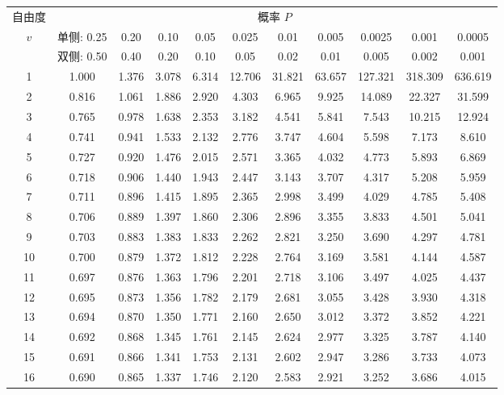 \documentclass[lang=cn,10pt]{elegantbook}
\begin{document}
\begin{longtable}{c|cccccccccc}
    \hline
    自由度 & \multicolumn{10}{c}{概率 $P$} \\
    $v$ & 单侧: 0.25 & 0.20 & 0.10 & 0.05 & 0.025 & 0.01 & 0.005 & 0.0025 & 0.001 & 0.0005 \\
    & 双侧: 0.50 & 0.40 & 0.20 & 0.10 & 0.05 & 0.02 & 0.01 & 0.005 & 0.002 & 0.001 \\
    \hline
    \endhead
    1  & 1.000 & 1.376 & 3.078 & 6.314 & 12.706 & 31.821 & 63.657 & 127.321 & 318.309 & 636.619 \\
    2  & 0.816 & 1.061 & 1.886 & 2.920 & 4.303  & 6.965  & 9.925  & 14.089  & 22.327  & 31.599 \\
    3  & 0.765 & 0.978 & 1.638 & 2.353 & 3.182  & 4.541  & 5.841  & 7.543   & 10.215  & 12.924 \\
    4  & 0.741 & 0.941 & 1.533 & 2.132 & 2.776  & 3.747  & 4.604  & 5.598   & 7.173   & 8.610 \\
    5  & 0.727 & 0.920 & 1.476 & 2.015 & 2.571  & 3.365  & 4.032  & 4.773   & 5.893   & 6.869 \\
    6  & 0.718 & 0.906 & 1.440 & 1.943 & 2.447  & 3.143  & 3.707  & 4.317   & 5.208   & 5.959 \\
    7  & 0.711 & 0.896 & 1.415 & 1.895 & 2.365  & 2.998  & 3.499  & 4.029   & 4.785   & 5.408 \\
    8  & 0.706 & 0.889 & 1.397 & 1.860 & 2.306  & 2.896  & 3.355  & 3.833   & 4.501   & 5.041 \\
    9  & 0.703 & 0.883 & 1.383 & 1.833 & 2.262  & 2.821  & 3.250  & 3.690   & 4.297   & 4.781 \\
    10 & 0.700 & 0.879 & 1.372 & 1.812 & 2.228  & 2.764  & 3.169  & 3.581   & 4.144   & 4.587 \\
    11 & 0.697 & 0.876 & 1.363 & 1.796 & 2.201  & 2.718  & 3.106  & 3.497   & 4.025   & 4.437 \\
    12 & 0.695 & 0.873 & 1.356 & 1.782 & 2.179  & 2.681  & 3.055  & 3.428   & 3.930   & 4.318 \\
    13 & 0.694 & 0.870 & 1.350 & 1.771 & 2.160  & 2.650  & 3.012  & 3.372   & 3.852   & 4.221 \\
    14 & 0.692 & 0.868 & 1.345 & 1.761 & 2.145  & 2.624  & 2.977  & 3.325   & 3.787   & 4.140 \\
    15 & 0.691 & 0.866 & 1.341 & 1.753 & 2.131  & 2.602  & 2.947  & 3.286   & 3.733   & 4.073 \\
    16 & 0.690 & 0.865 & 1.337 & 1.746 & 2.120  & 2.583  & 2.921  & 3.252   & 3.686   & 4.015 \\

\end{longtable}
\end{document}
